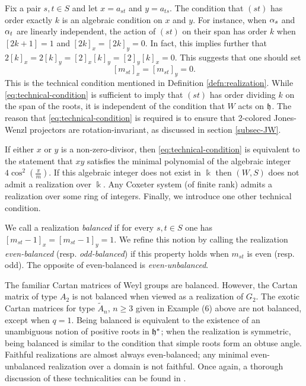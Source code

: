 Fix a pair $s,t \in S$ and let $x=a_{st}$ and $y=a_{ts}$. The condition that $(st)$ has order exactly $k$ is an algebraic condition on $x$ and $y$. For instance, when $\alpha_s$ and $\alpha_t$ are
linearly independent, the action of $(st)$ on their span has order $k$ when $[2k+1]=1$ and $[2k]_x = [2k]_y = 0$. In fact, this implies further that $2[k]_x = 2[k]_y = [2]_x [k]_y = [2]_y
[k]_x = 0$. This suggests that one should set \begin{equation} \label{eq:technical-condition} [m_{st}]_x = [m_{st}]_y = 0. \end{equation} This is the technical condition mentioned in
Definition \ref{defn:realization}. While \eqref{eq:technical-condition} is sufficient to imply that $(st)$ has order dividing $k$ on the span of the roots, it is independent of the
condition that $W$ acts on ${\mathfrak h}$. The reason that \eqref{eq:technical-condition} is required is to ensure that 2-colored Jones-Wenzl projectors are rotation-invariant, as discussed in
section \ref{subsec-JW}.

If either $x$ or $y$ is a non-zero-divisor, then \eqref{eq:technical-condition} is equivalent to the statement that $xy$ satisfies the minimal polynomial of the algebraic integer $4
\cos^2(\frac{\pi}{m})$. If this algebraic integer does not exist in $\Bbbk$ then $(W,S)$ does not admit a realization over $\Bbbk$. Any Coxeter system (of finite rank) admits a realization
over some ring of integers. Finally, we introduce one other technical condition.

\begin{defn} We call a realization \emph{balanced} if for every $s,t \in S$ one has $[m_{st}-1]_x = [m_{st}-1]_y = 1$. We refine this notion by calling the realization \emph{even-balanced}
(resp. \emph{odd-balanced}) if this property holds when $m_{st}$ is even (resp. odd). The opposite of even-balanced is \emph{even-unbalanced}. \end{defn}

The familiar Cartan matrices of Weyl groups are balanced. However, the Cartan matrix of type $A_2$ is not balanced when viewed as a realization of $G_2$. The exotic Cartan matrices for
type $\tilde{A}_n$, $n \ge 3$ given in Example (6) above are not balanced, except when $q=1$. Being balanced is equivalent to the existence of an unambiguous notion of positive roots in
${\mathfrak h}^*$; when the realization is symmetric, being balanced is similar to the condition that simple roots form an obtuse angle. Faithful realizations are almost always even-balanced; any
minimal even-unbalanced realization over a domain is not faithful. Once again, a thorough discussion of these technicalities can be found in \cite{EDihedral}.

